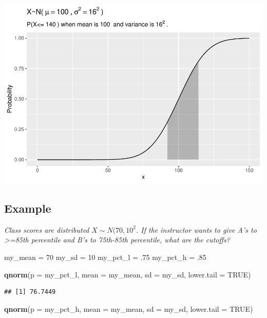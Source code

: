 \documentclass[]{book}
\newenvironment{Shaded}{\begin{snugshade}}{\end{snugshade}}
\newcommand{\DataTypeTok}[1]{\textcolor[rgb]{0.13,0.29,0.53}{#1}}
\newcommand{\DecValTok}[1]{\textcolor[rgb]{0.00,0.00,0.81}{#1}}
\newcommand{\FloatTok}[1]{\textcolor[rgb]{0.00,0.00,0.81}{#1}}
\newcommand{\KeywordTok}[1]{\textcolor[rgb]{0.13,0.29,0.53}{\textbf{#1}}}
\newcommand{\NormalTok}[1]{#1}
\newcommand{\OtherTok}[1]{\textcolor[rgb]{0.56,0.35,0.01}{#1}}
\newcommand{\StringTok}[1]{\textcolor[rgb]{0.31,0.60,0.02}{#1}}
\begin{document}
\includegraphics{data-sci_files/figure-latex/unnamed-chunk-15-1.pdf}

\hypertarget{example-3}{%
\subsection{Example}\label{example-3}}

\emph{Class scores are distributed }\(X \sim N(70, 10^2\)\emph{. If the instructor wants to give A's to \textgreater=85th percentile and B's to 75th-85th percentile, what are the cutoffs?}

\begin{Shaded}
\begin{Highlighting}[]
\NormalTok{my_mean =}\StringTok{ }\DecValTok{70}
\NormalTok{my_sd =}\StringTok{ }\DecValTok{10}
\NormalTok{my_pct_l =}\StringTok{ }\FloatTok{.75}
\NormalTok{my_pct_h =}\StringTok{ }\FloatTok{.85}

\KeywordTok{qnorm}\NormalTok{(}\DataTypeTok{p =}\NormalTok{ my_pct_l, }\DataTypeTok{mean =}\NormalTok{ my_mean, }\DataTypeTok{sd =}\NormalTok{ my_sd, }\DataTypeTok{lower.tail =} \OtherTok{TRUE}\NormalTok{)}
\end{Highlighting}
\end{Shaded}

\begin{verbatim}
## [1] 76.7449
\end{verbatim}

\begin{Shaded}
\begin{Highlighting}[]
\KeywordTok{qnorm}\NormalTok{(}\DataTypeTok{p =}\NormalTok{ my_pct_h, }\DataTypeTok{mean =}\NormalTok{ my_mean, }\DataTypeTok{sd =}\NormalTok{ my_sd, }\DataTypeTok{lower.tail =} \OtherTok{TRUE}\NormalTok{)}
\end{Highlighting}
\end{Shaded}
\end{document}
